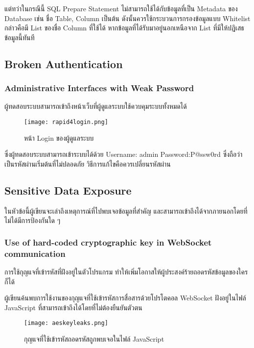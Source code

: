 แต่ทว่าในกรณีนี้ SQL Prepare Statement ไม่สามารถใช้ได้กับข้อมูลที่เป็น Metadata ของ Database เช่น ชื่อ Table, Column เป็นต้น ดังนั้นควรใช้กระบวนการกรองข้อมูลแบบ Whitelist กล่าวคือมี List ของชื่อ Column ที่ใช้ได้ หากข้อมูลที่ได้รับมาอยู่นอกเหนือจาก List ที่มีให้ปฏิเสธข้อมูลนี้ทันที

\subsection{Broken Authentication}

\subsubsection{	Administrative Interfaces with Weak Password}

ผู้ทดสอบระบบสามารถเข้าถึงหน้าเว็บที่ผู้ดูแลระบบใช้ควบคุมระบบทั้งหมดได้

 \begin{figure}[h]
	\centering
	\texttt{[image: rapid4login.png]}
	\caption{หน้า Login ของผู้ดูแลระบบ}
	\label{Fig:rapid4login.png}
\end{figure}

ซึ่งผู้ทดสอบระบบสามารถเข้าระบบได้ด้วย Username: admin Password:P@ssw0rd ซึ่งถือว่าเป็นรหัสผ่านเริ่มต้นที่ไม่ปลอดภัย วิธีการแก้ไขคือควรเปลี่ยนรหัสผ่าน

\subsection{Sensitive Data Exposure}

ในหัวข้อนี้ผู้เขียนจะเล่าถึงเหตุการณ์ที่ไปพบเจอข้อมูลที่สำคัญ และสามารถเข้าถึงได้จากภายนอกโดยที่ไม่ได้มีการป้องกันใด ๆ
 
 
\subsubsection{Use of hard-coded cryptographic key in WebSocket communication}

การใช้กุญแจที่เข้ารหัสที่ฝังอยู่ในตัวโปรแกรม ทำให้เพิ่มโอกาสให้ผู้ประสงค์ร้ายถอดรหัสข้อมูลของใครก็ได้

ผู้เขียนค้นพบการใช้งานของกุญแจที่ใช้เข้ารหัสการสื่อสารด้วยโปรโตคอล WebSocket ฝังอยู่ในไฟล์ JavaScript ที่สามารถเข้าถึงได้โดยที่ไม่ต้องยืนยันตัวตน

 \begin{figure}[h]
	\centering
	\texttt{[image: aeskeyleaks.png]}
	\caption{กุญแจที่ใช้เข้ารหัสถอดรหัสถูกพบเจอในไฟล์ JavaScript}
	\label{Fig:aeskeyleaks.png}
\end{figure}
 
